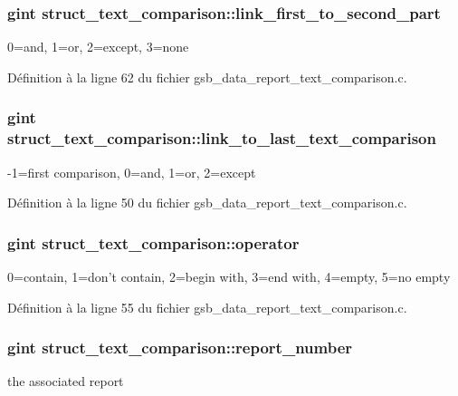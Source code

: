 \subsubsection[{link\_\-first\_\-to\_\-second\_\-part}]{\setlength{\rightskip}{0pt plus 5cm}gint {\bf struct\_\-text\_\-comparison::link\_\-first\_\-to\_\-second\_\-part}}\label{structstruct__text__comparison_ae6db7d2ad681475c3698223b4507e0bb}
0=and, 1=or, 2=except, 3=none 

Définition à la ligne 62 du fichier gsb\_\-data\_\-report\_\-text\_\-comparison.c.

\subsubsection[{link\_\-to\_\-last\_\-text\_\-comparison}]{\setlength{\rightskip}{0pt plus 5cm}gint {\bf struct\_\-text\_\-comparison::link\_\-to\_\-last\_\-text\_\-comparison}}\label{structstruct__text__comparison_aa70f3b5381fb4b6b82d4080b14769322}
-\/1=first comparison, 0=and, 1=or, 2=except 

Définition à la ligne 50 du fichier gsb\_\-data\_\-report\_\-text\_\-comparison.c.

\subsubsection[{operator}]{\setlength{\rightskip}{0pt plus 5cm}gint {\bf struct\_\-text\_\-comparison::operator}}\label{structstruct__text__comparison_a894850cb450689bdd0e20fd8689db90a}
0=contain, 1=don't contain, 2=begin with, 3=end with, 4=empty, 5=no empty 

Définition à la ligne 55 du fichier gsb\_\-data\_\-report\_\-text\_\-comparison.c.

\subsubsection[{report\_\-number}]{\setlength{\rightskip}{0pt plus 5cm}gint {\bf struct\_\-text\_\-comparison::report\_\-number}}\label{structstruct__text__comparison_aa55170eaa289f8bcdcd7d42357aa3b28}
the associated report 


